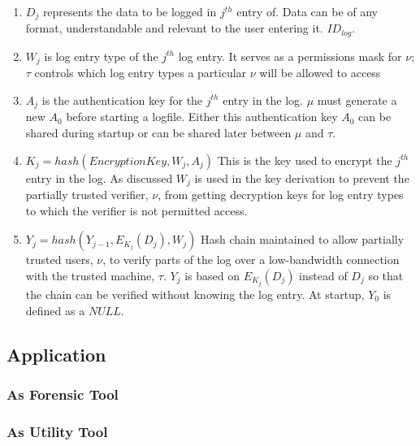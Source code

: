 \documentclass[12pt, letter]{article}
\begin{document}
\begin{enumerate}
    \item $D_j$ represents the data to be logged in $j^{th}$ entry of. Data can be of any format, understandable and relevant to the user entering it. $ID_{log}$.
    
    \item $W_j$ is log entry type of the $j^{th}$ log entry. It serves as a permissions mask for $\nu$; $\tau$ controls which log entry types a particular $\nu$ will be allowed to access
    
    \item  $A_j$ is the authentication key for the $j^{th}$ entry in the log. $\mu$ must generate a new $A_0$ before starting a logfile. Either this authentication key $A_0$ can be shared during startup or can be shared later between $\mu$ and $\tau$.
    
    \item $K_j = hash(Encryption Key, W_j, A_j)$ This is the key used to encrypt the $j^{th}$ entry in the log. As discussed $W_j$ is used in the key derivation to prevent the partially trusted verifier, $\nu$, from getting decryption keys for log entry types to which the verifier is not permitted access.
    
    \item $Y_j = hash(Y_{j-1}, E_{K_j}(D_j), W_j)$ Hash chain maintained to allow partially trusted users, $\nu$, to verify parts of the log over a low-bandwidth connection with the trusted machine, $\tau$. $Y_j$ is based on $E_{K_j}(D_j)$ instead of $D_j$ so that the chain can be verified without knowing the log entry. At startup, $Y_0$ is defined as a $NULL$. 
\end{enumerate}

\subsection{Application}
\label{sec:application}

\blindtext

\subsubsection{As Forensic Tool}

\blindtext

\subsubsection{As Utility Tool}
\end{document}
